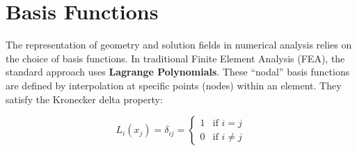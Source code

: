 \documentclass[12pt,report,justified]{SANDreport}
\begin{document}

% 
% 
% 
% 
% 
% 
% 

\appendix
\chapter{Basis Functions}
\label{appendix:basis}

The representation of geometry and solution fields in numerical analysis relies on the choice of basis functions. In traditional Finite Element Analysis (FEA), the standard approach uses {\bf Lagrange Polynomials}. These ``nodal'' basis functions are defined by interpolation at specific points (nodes) within an element. They satisfy the Kronecker delta property:

\begin{equation}
L_i(x_j) = \delta_{ij} = \begin{cases} 1 & \text{if } i = j \\ 0 & \text{if } i \neq j \end{cases}
\label{eq:kronecker}
\end{equation}
\end{document}

